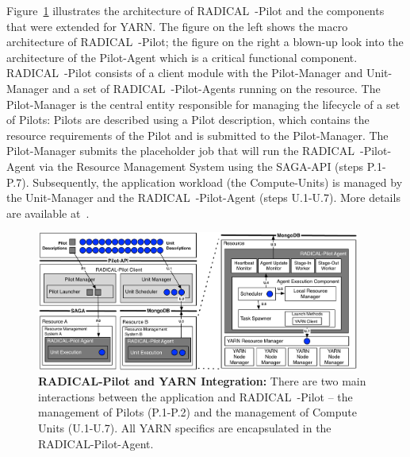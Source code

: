 Figure~\ref{fig:comp_rp_arch} illustrates the architecture of RADICAL~-Pilot and the components that were extended for YARN.
The figure on the left shows the macro architecture of RADICAL~-Pilot; the figure on the right a blown-up look into the architecture of the Pilot-Agent which is a critical functional component.
RADICAL~-Pilot consists of a client module with the Pilot-Manager and Unit-Manager and a set of RADICAL~-Pilot-Agents running on the resource.
The Pilot-Manager is the central entity responsible for managing the lifecycle of a set of Pilots: Pilots are described using a Pilot description, which contains the resource requirements of the Pilot and is submitted to the Pilot-Manager.
The Pilot-Manager submits the placeholder job that will run the RADICAL~-Pilot-Agent via the Resource Management System using the SAGA-API (steps P.1-P.7).
Subsequently, the application workload (the Compute-Units) is managed by the Unit-Manager and the RADICAL~-Pilot-Agent (steps U.1-U.7).
More details are available at~\cite{merzky2019using}.

\begin{figure}
    \centering
    \includegraphics[width=0.95\textwidth]{figures/data_analytics_hpc/hpc_hadoop/rp-architecture-yarn.pdf}
    \caption{\textbf{RADICAL-Pilot and YARN Integration:}
        There are two main interactions between the application and RADICAL~-Pilot -- the management of Pilots (P.1-P.2) and the management of Compute Units (U.1-U.7).
        All YARN specifics are encapsulated in the RADICAL-Pilot-Agent.\label{fig:comp_rp_arch}}
\end{figure}

